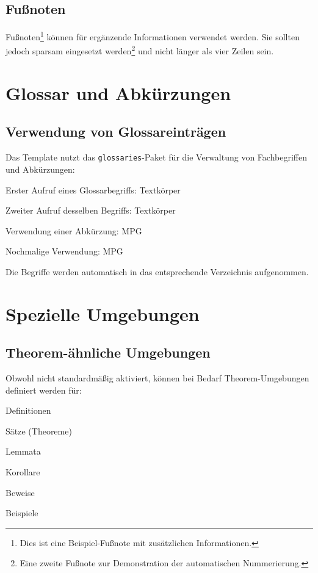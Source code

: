 \subsection{Fußnoten}
\label{subsec:fussnoten_demo}

Fußnoten\footnote{Dies ist eine Beispiel-Fußnote mit zusätzlichen Informationen.} können für ergänzende Informationen verwendet werden. Sie sollten jedoch sparsam eingesetzt werden\footnote{Eine zweite Fußnote zur Demonstration der automatischen Nummerierung.} und nicht länger als vier Zeilen sein.

\section{Glossar und Abkürzungen}
\label{sec:glossar_demo}

\subsection{Verwendung von Glossareinträgen}
\label{subsec:glossar_verwendung}

Das Template nutzt das \texttt{glossaries}-Paket für die Verwaltung von Fachbegriffen und Abkürzungen:
\begin{listenabsatz}
	\item Erster Aufruf eines Glossarbegriffs: \gls{Textkörper}
	\item Zweiter Aufruf desselben Begriffs: \gls{Textkörper}
	\item Verwendung einer Abkürzung: \gls{MPG}
	\item Nochmalige Verwendung: \gls{MPG}
\end{listenabsatz}

Die Begriffe werden automatisch in das entsprechende Verzeichnis aufgenommen.

\section{Spezielle Umgebungen}
\label{sec:spezielle_umgebungen}

\subsection{Theorem-ähnliche Umgebungen}
\label{subsec:theoreme}

Obwohl nicht standardmäßig aktiviert, können bei Bedarf Theorem-Umgebungen definiert werden für:
\begin{listenabsatz}
	\item Definitionen
	\item Sätze (Theoreme)
	\item Lemmata
	\item Korollare
	\item Beweise
	\item Beispiele
\end{listenabsatz}


